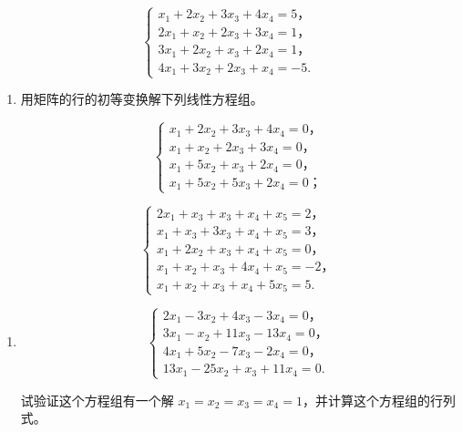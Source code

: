 \[
\left\{ \begin{array}{l} x _ {1} + 2 x _ {2} + 3 x _ {3} + 4 x _ {4} = 5\text{，} \\ 2 x _ {1} + x _ {2} + 2 x _ {3} + 3 x _ {4} = 1\text{，} \\ 3 x _ {1} + 2 x _ {2} + x _ {3} + 2 x _ {4} = 1\text{，} \\ 4 x _ {1} + 3 x _ {2} + 2 x _ {3} + x _ {4} = - 5. \end{array} \right.
\]

\begin{enumerate}[start=9,label={*\arabic*.}]
\item
  用矩阵的行的初等变换解下列线性方程组。

\[
\left\{ \begin{array}{l} x _ {1} + 2 x _ {2} + 3 x _ {3} + 4 x _ {4} = 0\text{，} \\ x _ {1} + x _ {2} + 2 x _ {3} + 3 x _ {4} = 0\text{，} \\ x _ {1} + 5 x _ {2} + x _ {3} + 2 x _ {4} = 0\text{，} \\ x _ {1} + 5 x _ {2} + 5 x _ {3} + 2 x _ {4} = 0\text{；} \end{array} \right. \tag {1}
\]

\[
\left\{ \begin{array}{l} 2 x _ {1} + x _ {3} + x _ {3} + x _ {4} + x _ {5} = 2\text{，} \\ x _ {1} + x _ {3} + 3 x _ {3} + x _ {4} + x _ {5} = 3\text{，} \\ x _ {1} + 2 x _ {2} + x _ {3} + x _ {4} + x _ {5} = 0\text{，} \\ x _ {1} + x _ {2} + x _ {3} + 4 x _ {4} + x _ {5} = - 2\text{，} \\ x _ {1} + x _ {2} + x _ {3} + x _ {4} + 5 x _ {5} = 5. \end{array} \right. \tag {2}
\]
\end{enumerate}

\begin{enumerate}[start=10]
\item
\[
\left\{ \begin{array}{l} 2 x _ {1} - 3 x _ {2} + 4 x _ {3} - 3 x _ {4} = 0\text{，} \\ 3 x _ {1} - x _ {2} + 11 x _ {3} - 13 x _ {4} = 0\text{，} \\ 4 x _ {1} + 5 x _ {2} - 7 x _ {3} - 2 x _ {4} = 0\text{，} \\ 13 x _ {1} - 25 x _ {2} + x _ {3} + 11 x _ {4} = 0. \end{array} \right.
\]

试验证这个方程组有一个解
\(x_{1} = x_{2} = x_{3} = x_{4} = 1\)，并计算这个方程组的行列式。
\end{enumerate}

